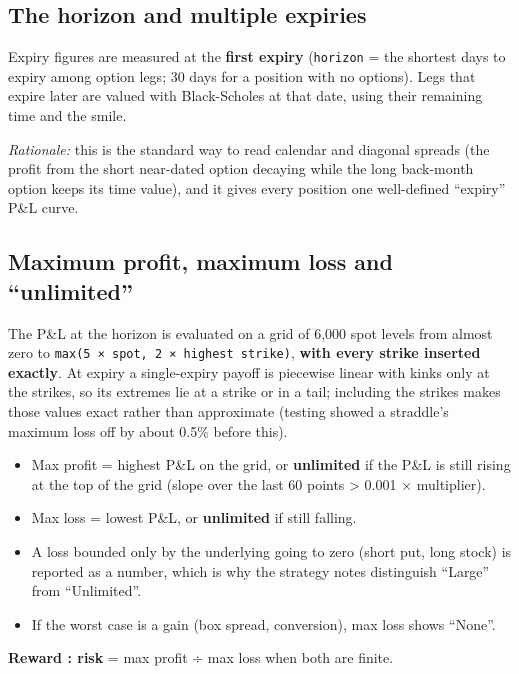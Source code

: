 \documentclass[10pt,a4paper]{article}
\providecommand{\tightlist}{\setlength{\itemsep}{1pt}\setlength{\parskip}{0pt}}
\numberwithin{equation}{section}
\begin{document}
\subsection{The horizon and multiple expiries}\label{the-horizon-and-multiple-expiries}

Expiry figures are measured at the \textbf{first expiry} (\texttt{horizon} = the shortest days to expiry among option legs; 30 days for a position with no options). Legs that expire later are valued with Black-Scholes at that date, using their remaining time and the smile.

\emph{Rationale:} this is the standard way to read calendar and diagonal spreads (the profit from the short near-dated option decaying while the long back-month option keeps its time value), and it gives every position one well-defined ``expiry'' P\&L curve.

\subsection{Maximum profit, maximum loss and ``unlimited''}\label{maximum-profit-maximum-loss-and-unlimited}

The P\&L at the horizon is evaluated on a grid of 6,000 spot levels from almost zero to \texttt{max(5\ ×\ spot,\ 2\ ×\ highest\ strike)}, \textbf{with every strike inserted exactly}. At expiry a single-expiry payoff is piecewise linear with kinks only at the strikes, so its extremes lie at a strike or in a tail; including the strikes makes those values exact rather than approximate (testing showed a straddle's maximum loss off by about 0.5\% before this).

\begin{itemize}
\tightlist
\item
  Max profit = highest P\&L on the grid, or \textbf{unlimited} if the P\&L is still rising at the top of the grid (slope over the last 60 points \textgreater{} 0.001 × multiplier).
\item
  Max loss = lowest P\&L, or \textbf{unlimited} if still falling.
\item
  A loss bounded only by the underlying going to zero (short put, long stock) is reported as a number, which is why the strategy notes distinguish ``Large'' from ``Unlimited''.
\item
  If the worst case is a gain (box spread, conversion), max loss shows ``None''.
\end{itemize}

\textbf{Reward : risk} = max profit ÷ \textbar max loss\textbar{} when both are finite.
\end{document}
